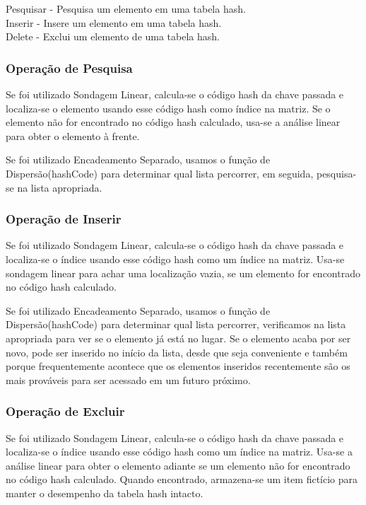 \documentclass[a4paper, 12pt]{article}
\begin{document}
Pesquisar - Pesquisa um elemento em uma tabela hash.\\

Inserir - Insere um elemento em uma tabela hash.\\

Delete - Exclui um elemento de uma tabela hash.\\


\subsubsection{Operação de Pesquisa}

Se foi utilizado Sondagem Linear, calcula-se o código hash da chave passada e localiza-se o elemento usando esse código hash como índice na matriz. Se o elemento não for encontrado no código hash calculado, usa-se a análise linear para obter o elemento à frente.

Se foi utilizado Encadeamento Separado, usamos o função de Dispersão(hashCode) para determinar qual lista percorrer, em seguida, pesquisa-se na lista apropriada.




\subsubsection{Operação de Inserir}

Se foi utilizado Sondagem Linear, calcula-se o código hash da chave passada e localiza-se o índice usando esse código hash como um índice na matriz. Usa-se sondagem linear para achar uma localização vazia, se um elemento for encontrado no código hash calculado.

Se foi utilizado Encadeamento Separado, usamos o função de Dispersão(hashCode) para determinar qual lista percorrer, verificamos na lista apropriada para ver se o elemento já está no lugar. Se o elemento acaba por ser novo, pode ser inserido no início da lista, desde que seja conveniente e também porque frequentemente acontece que os elementos inseridos recentemente são os mais prováveis para ser acessado em um futuro próximo.

\subsubsection{Operação de Excluir}


Se foi utilizado Sondagem Linear, calcula-se o código hash da chave passada e localiza-se o índice usando esse código hash como um índice na matriz. Usa-se a análise linear para obter o elemento adiante se um elemento não for encontrado no código hash calculado. Quando encontrado, armazena-se um item fictício para manter o desempenho da tabela hash intacto.
\end{document}
